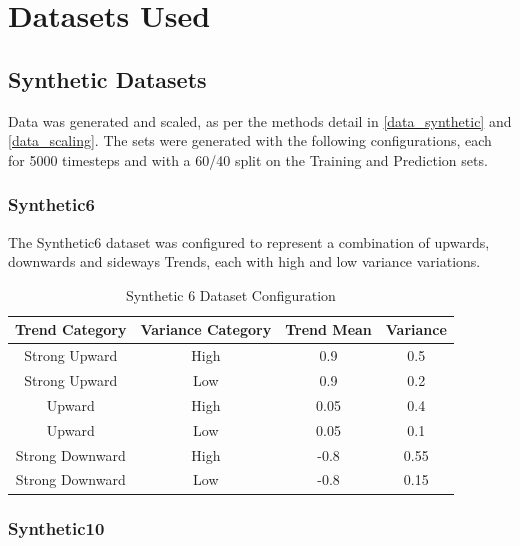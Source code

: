 \documentclass[a4paper,11pt,oneside]{article}
\theoremstyle{plain}
\theoremstyle{definition}
\begin{document}
\newpage
\section{Datasets Used}\label{Datasets}

\subsection{Synthetic Datasets}

Data was generated and scaled, as per the methods detail in \ref{data_synthetic} and \ref{data_scaling}. The sets were generated with the following configurations, each for 5000 timesteps and with a 60/40 split on the Training and Prediction sets.

\subsubsection{Synthetic6} \label{dataset_synthetic6}

The Synthetic6 dataset was configured to represent a combination of upwards, downwards and sideways Trends, each with high and low variance variations.

\begin{table}[h]
	\centering
	\begin{tabular}{|c|c|c|c|}
		\hline
		\textbf{Trend Category} &\textbf{Variance Category} & \textbf{Trend Mean} & \textbf{Variance}\\\hline	
		{Strong Upward} & {High} & {0.9} & {0.5} \\\hline
		{Strong Upward} & {Low} & {0.9} & {0.2} \\\hline
		{Upward} & {High} & {0.05} & {0.4} \\\hline
		{Upward} & {Low} & {0.05} & {0.1} \\\hline
		{Strong Downward} & {High} & {-0.8} & {0.55} \\\hline
		{Strong Downward} & {Low} & {-0.8} & {0.15} \\\hline
	\end{tabular}
	\newline\newline
	\caption{Synthetic 6 Dataset Configuration}\label{tab_synth6}
\end{table}

\subsubsection{Synthetic10}\label{dataset_synthetic10}
\end{document}
